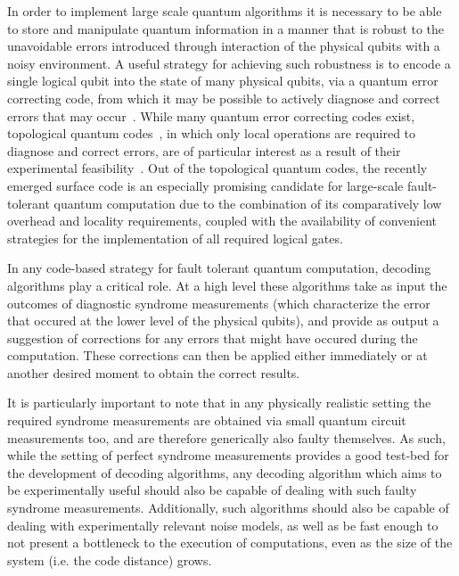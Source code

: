 \documentclass[twocolumn,preprintnumbers,amsmath,amssymb,notitlepage,nofootinbib,longbibliography,superscriptaddress,aps,pra,10pt]{revtex4-1}
\begin{document}
	In order to implement large scale quantum algorithms it is necessary to be able to store and manipulate quantum information in a manner
	that is robust to the unavoidable errors introduced through interaction of the physical qubits with a noisy environment.
	A useful strategy for achieving such robustness is to encode a single logical qubit into the state of many physical qubits,
	via a quantum error correcting code, from which it may be possible to actively diagnose and correct errors that may
	occur~\cite{Terhal15,Campbell17}. While many quantum error correcting codes exist, topological quantum
	codes~\cite{Kitaev03, Dennis02, Preskill17lectures, Nayak08, Pachos12, Terhal15, Brown16, Campbell17}, in which only local operations
	are required to diagnose and correct errors, are of particular interest as a result of their
	experimental feasibility~\cite{Reed12, Barends14, Nigg14, Corcoles15, Albrecht16, Takita16, Linke17}.
	Out of the topological quantum codes, the recently emerged surface code is an especially promising candidate for large-scale
	fault-tolerant quantum computation due to the combination of its comparatively low overhead and locality requirements, coupled
	with the availability of convenient strategies for the implementation of all required logical gates.

	In any code-based strategy for fault tolerant quantum computation, decoding algorithms play a critical role.
	At a high level these algorithms take as input the outcomes of diagnostic syndrome measurements (which characterize the
	error that occured at the lower level of the physical qubits), and provide as output a suggestion of
	corrections for any errors that might have occured during the computation. These corrections can then be applied either immediately or at
	another desired moment to obtain the correct results.

	It is particularly important to note that in any physically realistic setting the required syndrome measurements are obtained
	via small quantum circuit measurements too, and are therefore generically also faulty themselves.
	As such, while the setting of perfect syndrome measurements provides a good test-bed for the development of decoding algorithms, any
	decoding algorithm which aims to be experimentally useful should also be capable of dealing with such faulty syndrome measurements.
	Additionally, such algorithms should also be capable of dealing with experimentally relevant noise models, as well as be fast
	enough to not present a bottleneck to the execution of computations, even as the size of the system (i.e. the code distance) grows.
\end{document}
